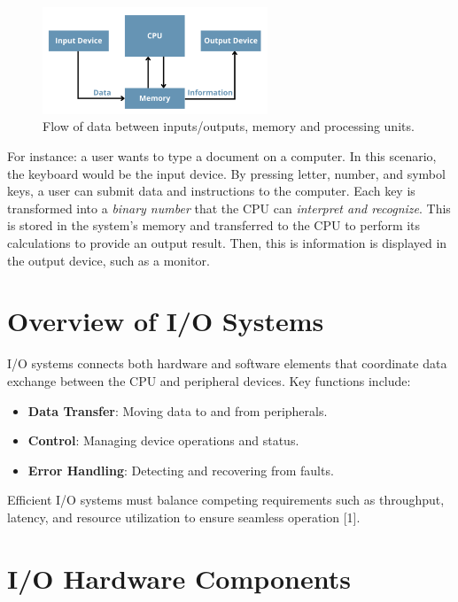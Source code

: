 \documentclass[a4paper]{article}
\begin{document}
\begin{figure}[H]
    \centering
    \includegraphics[width=0.6\textwidth]{IO.png}
    \caption{Flow of data between inputs/outputs, memory and processing units.}
\end{figure}

For instance: a user wants to type a document on a computer.
In this scenario, the keyboard would be the input device. 
By pressing letter, number, and symbol keys, a user can submit data and
instructions to the computer. Each key is transformed into a \textit{binary number} that the
CPU can \textit{interpret and recognize}. This is stored in the system’s memory and transferred 
to the CPU to perform its calculations to provide an output result. 
Then, this is information is displayed in the output device, such as a monitor.



\section{Overview of I/O Systems}

I/O systems connects both hardware and software elements that coordinate data 
exchange between the CPU and peripheral devices. Key functions include:

\begin{itemize}
    \item \textbf{Data Transfer}: Moving data to and from peripherals.
    \item \textbf{Control}: Managing device operations and status.
    \item \textbf{Error Handling}: Detecting and recovering from faults.
\end{itemize}
Efficient I/O systems must balance competing requirements such as throughput, latency, 
and resource utilization to ensure seamless operation [1].


\section{I/O Hardware Components}
\end{document}

